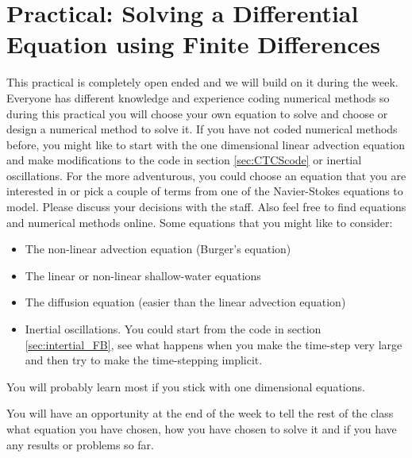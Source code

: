\clearpage{}

\section{Practical: Solving a Differential Equation using Finite Differences}

This practical is completely open ended and we will build on it during
the week. Everyone has different knowledge and experience coding numerical
methods so during this practical you will choose your own equation
to solve and choose or design a numerical method to solve it. If you
have not coded numerical methods before, you might like to start with
the one dimensional linear advection equation and make modifications
to the code in section \ref{sec:CTCScode} or inertial oscillations.
For the more adventurous, you could choose an equation that you are
interested in or pick a couple of terms from one of the Navier-Stokes
equations to model. Please discuss your decisions with the staff.
Also feel free to find equations and numerical methods online. Some
equations that you might like to consider:
\begin{itemize}
\item The non-linear advection equation (Burger's equation)
\item The linear or non-linear shallow-water equations
\item The diffusion equation (easier than the linear advection equation)
\item Inertial oscillations. You could start from the code in section \ref{sec:intertial_FB},
see what happens when you make the time-step very large and then try
to make the time-stepping implicit.
\end{itemize}
You will probably learn most if you stick with one dimensional equations. 

You will have an opportunity at the end of the week to tell the rest
of the class what equation you have chosen, how you have chosen to
solve it and if you have any results or problems so far. 
